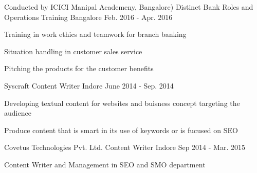\begin{cventries}
  \cventry
    {Conducted by ICICI Manipal Academeny, Bangalore)}
    {Distinct Bank Roles and Operations Training}
    {Bangalore}
    {Feb. 2016 - Apr. 2016}
    {
      \begin{cvitems}
        \item {Training in work ethics and teamwork for branch banking}
        \item {Situation handling in customer sales service}
        \item {Pitching the products for the customer benefits}
      \end{cvitems}
    }
  \cventry
    {Syscraft}
    {Content Writer}
    {Indore}
    {June 2014 - Sep. 2014}
    {
      \begin{cvitems}
        \item {Developing textual content for websites and buisness concept targeting the audience}
        \item {Produce content that is smart in its use of keywords or is fucused on SEO}
      \end{cvitems}
    }
  \cventry
    {Covetus Technologies Pvt. Ltd.}
    {Content Writer}
    {Indore}
    {Sep 2014 - Mar. 2015}
    {
      \begin{cvitems}
        \item {Content Writer and Management in SEO and SMO department}
      \end{cvitems}
    }
\end{cventries}

